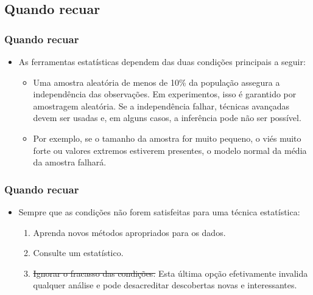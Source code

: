 
\subsection{Quando recuar}


\begin{frame}
\frametitle{Quando recuar}

\begin{itemize}
\justifying
\item As ferramentas estatísticas dependem das duas condições principais a seguir:
\begin{itemize}
\justifying
\item {} Uma amostra aleatória de menos de 10\% da população assegura a independência das observações. Em experimentos, isso é garantido por amostragem aleatória. Se a independência falhar, técnicas avançadas devem ser usadas e, em alguns casos, a inferência pode não ser possível.
\justifying
\item {} Por exemplo, se o tamanho da amostra for muito pequeno, o viés muito forte ou valores extremos estiverem presentes, o modelo normal da média da amostra falhará.
\end{itemize}
\end{itemize}

\end{frame}

\begin{frame}
\frametitle{Quando recuar}

\begin{itemize}
\justifying
\item Sempre que as condições não forem satisfeitas para uma técnica estatística:
\begin{enumerate}
\justifying
\item Aprenda novos métodos apropriados para os dados. 
\justifying
\item Consulte um estatístico.
\justifying
\item \sout{Ignorar o fracasso das condições.} Esta última opção efetivamente invalida qualquer análise e pode desacreditar descobertas novas e interessantes.
\end{enumerate}

\end{itemize}

\end{frame}

